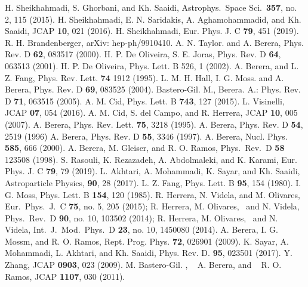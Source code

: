\documentclass[12pt]{revtex4}
\begin{document}
\begin{thebibliography}{99}
 H. Sheikhahmadi, S. Ghorbani, and  Kh. Saaidi,  Astrophys.\ Space Sci.\  {\bf 357}, no. 2, 115 (2015).
H. Sheikhahmadi,  E. N. Saridakis,  A. Aghamohammadid,  and Kh. Saaidi, JCAP \textbf{10}, 021 (2016).
  H. Sheikhahmadi,  Eur. Phys. J. C  \textbf{79}, 451 (2019).
 R. H. Brandenberger, arXiv: hep-ph/9910410.
 A. N. Taylor. and   A. Berera, Phys. Rev. D \textbf{62}, 083517 (2000).
  H. P. De Oliveira, S. E.  Joras, Phys. Rev. D \textbf{64}, 063513 (2001).
  H. P. De Oliveira, Phys. Lett. B 526, 1 (2002).
 A. Berera, and  L. Z. Fang, Phys. Rev. Lett. \textbf{74} 1912 (1995).
  L. M. H. Hall, I. G. Moss.  and   A. Berera, Phys. Rev. D \textbf{69}, 083525 (2004).
  Bastero-Gil. M., Berera. A.: Phys. Rev. D \textbf{71}, 063515 (2005).
  A. M. Cid, Phys. Lett. B \textbf{743}, 127 (2015).
  L. Visinelli, JCAP \textbf{07}, 054 (2016).
 A. M. Cid, S.  del Campo,  and  R. Herrera, JCAP {\bf10}, 005 (2007).
A. Berera, Phys. Rev. Lett.  \textbf{75}, 3218 (1995).
  A. Berera, Phys. Rev. D \textbf{54}, 2519 (1996)
  A. Berera, Phys. Rev. D  \textbf{55}, 3346 (1997).
  A. Berera, Nucl. Phys. \textbf{585}, 666 (2000).
  A. Berera, M.  Gleiser, and  R. O. Ramos, Phys.\ Rev.\ D \textbf{58} 123508 (1998).
  S. Rasouli,  K. Rezazadeh,  A. Abdolmaleki, and  K. Karami, Eur. Phys. J. C  \textbf{79}, 79 (2019).
 L. Akhtari,   A. Mohammadi,   K.  Sayar, and Kh.  Saaidi, Astroparticle Physics,  \textbf{90}, 28 (2017).
 L. Z. Fang, Phys. Lett. B \textbf{95}, 154 (1980).
 I. G. Moss, Phys. Lett. B \textbf{154}, 120 (1985).
     R. Herrera,  N. Videla, and  M. Olivares,  Eur.\ Phys.\ J.\ C \textbf{ 75}, no. 5, 205 (2015);
      R. Herrera, M. Olivares,~ and N. Videla, Phys.\ Rev.\ D  \textbf{90}, no. 10, 103502 (2014);
   R. Herrera,  M. Olivares,~ and N. Videla,  Int.\ J.\ Mod.\ Phys.\ D  \textbf{23}, no. 10, 1450080 (2014).
A. Berera,  I. G. Mossm,  and R. O.  Ramos, Rept. Prog. Phys. {\bf72}, 026901 (2009).
  K. Sayar, A. Mohammadi, L. Akhtari, and Kh. Saaidi,  Phys. Rev. D. \textbf{95}, 023501 (2017).
 Y. Zhang,  JCAP  \textbf{0903}, 023 (2009).
   M. Bastero-Gil. , ~ A. Berera, and ~ R. O. Ramos,  JCAP \textbf{ 1107}, 030 (2011).

\end{thebibliography}
\end{document}
